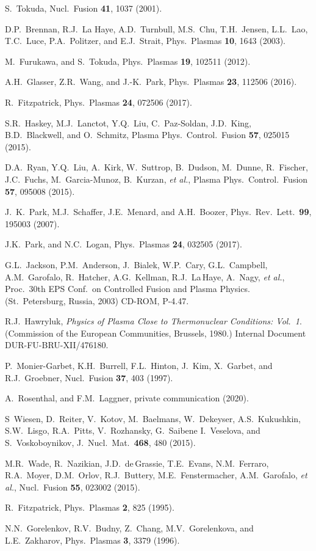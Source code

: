 \documentclass[12pt,prb,aps]{revtex4-1}
\begin{document}
\begin{thebibliography}{99}
 S.~Tokuda, Nucl.\ Fusion {\bf 41}, 1037 (2001).

 D.P.~Brennan, R.J.~La Haye, A.D.~Turnbull, M.S.~Chu, T.H.~Jensen, L.L.~Lao, T.C.~Luce, P.A.~Politzer, and E.J.~Strait,
Phys.\ Plasmas {\bf 10}, 1643 (2003).

 M.~Furukawa, and S.~Tokuda, Phys.\ Plasmas {\bf 19}, 102511 (2012).

 A.H.~Glasser, Z.R.~Wang, and J.-K.~Park, Phys.\ Plasmas {\bf 23}, 112506 (2016).

 R.~Fitzpatrick, Phys.\ Plasmas {\bf 24}, 072506 (2017). 

 S.R.~Haskey, M.J.~Lanctot, Y.Q.~Liu, C.~Paz-Soldan, J.D.~King, B.D.~Blackwell, and O.~Schmitz,  Plasma 
Phys.\ Control.\ Fusion {\bf 57}, 025015 (2015).

 D.A.~Ryan,  Y.Q.~Liu, A.~Kirk, W.~Suttrop, B.~Dudson, M.~Dunne, R.~Fischer, J.C.~Fuchs, M.~Garcia-Munoz, B.~Kurzan, {\it et al.}, 
Plasma Phys.\ Control.\ Fusion {\bf 57}, 095008 (2015).

 J.~K.~Park, M.J.~Schaffer, J.E.~Menard, and A.H.~Boozer, Phys.\ Rev.\ Lett.\ {\bf 99}, 195003 (2007).

 J.K.~Park, and N.C.~Logan, Phys.\ Plasmas {\bf 24}, 032505 (2017).

 G.L.~Jackson, P.M.~Anderson, J.~Bialek, W.P.~Cary, G.L.~Campbell, A.M.~Garofalo,  R.~Hatcher, A.G.~Kellman, R.J.~La\,Haye, A.~Nagy, {\em et al.},  
Proc.\ 30th EPS Conf.\ on Controlled Fusion and Plasma Physics. (St.\ Petersburg, Russia, 2003) CD-ROM, P-4.47.

 R.J.~Hawryluk, {\em Physics of Plasma Close to Thermonuclear Conditions: Vol.~1}. (Commission of the European Communities, Brussels, 1980.) 
Internal Document DUR-FU-BRU-XII/476180.

 P.~Monier-Garbet, K.H.~Burrell, F.L.~Hinton, J.~Kim, X.~Garbet, and R.J.~Groebner,   
Nucl.\ Fusion  {\bf 37}, 403 (1997).

 A.~Rosenthal, and F.M.~Laggner, private communication (2020).

 S~Wiesen, D.~Reiter, V.~Kotov, M.~Baelmans, W.~Dekeyser, A.S.~Kukushkin, S.W.~Lisgo, R.A.~Pitts, V.~Rozhansky, G.~Saibene I.~Veselova, and S.~Voskoboynikov,
J.\ Nucl.\ Mat.\ {\bf 468}, 480 (2015).

 M.R.~Wade, R.~Nazikian, J.D.~de\,Grassie, T.E.~Evans, N.M.~Ferraro, R.A.~Moyer, D.M.~Orlov, 
R.J.~Buttery, M.E.~Fenstermacher, A.M.~Garofalo, {\em et al.}, Nucl.\ Fusion {\bf 55}, 023002 (2015). 

 R.~Fitzpatrick,  Phys.\ Plasmas {\bf 2}, 825 (1995).

 N.N.~Gorelenkov, R.V.~Budny, Z.~Chang, M.V.~Gorelenkova, and L.E.~Zakharov, Phys.\ Plasmas {\bf 3}, 3379 (1996).

\end{thebibliography}
\end{document}
